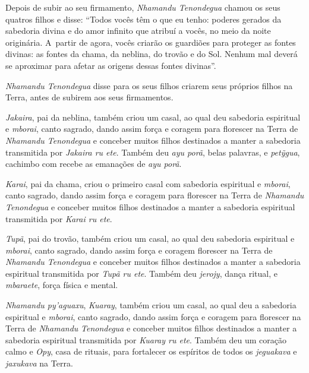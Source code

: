  



Depois de subir ao seu firmamento, \emph{Nhamandu Tenondegua} chamou os
seus quatros filhos e disse: ``Todos vocês têm o que eu tenho: poderes
gerados da sabedoria divina e do amor infinito que atribuí a vocês, no
meio da noite originária. A~partir de agora, vocês criarão os guardiões
para proteger as fontes divinas: as fontes da chama, da neblina, do
trovão e do Sol. Nenhum mal deverá se aproximar para afetar as origens
dessas fontes divinas''.

\emph{Nhamandu Tenondegua} disse para os seus filhos criarem seus
próprios filhos na Terra, antes de subirem aos seus firmamentos.

\emph{Jakaira}, pai da neblina, também criou um casal, ao qual deu
sabedoria espiritual e \emph{mborai}, canto sagrado, dando assim força e
coragem para florescer na Terra de \emph{Nhamandu Tenondegua} e conceber
muitos filhos destinados a manter a sabedoria transmitida por
\emph{Jakaira ru ete}. Também deu \emph{ayu porã}, belas palavras, e
\emph{petỹgua}, cachimbo com recebe as emanações de \emph{ayu porã}.


 

\emph{Karai}, pai da chama, criou o primeiro casal com sabedoria
espiritual e \emph{mborai}, canto sagrado, dando assim força e coragem
para florescer na Terra de \emph{Nhamandu Tenondegua} e conceber muitos
filhos destinados a manter a sabedoria espiritual transmitida por
\emph{Karai ru ete}.

\emph{Tupã}, pai do trovão, também criou um casal, ao qual deu sabedoria
espiritual e \emph{mborai}, canto sagrado, dando assim força e coragem
florescer na Terra de \emph{Nhamandu Tenondegua} e conceber muitos
filhos destinados a manter a sabedoria espiritual transmitida por
\emph{Tupã ru ete}. Também deu \emph{jerojy}, dança ritual, e
\emph{mbaraete}, força física e mental.

\emph{Nhamandu py'aguaxu}, \emph{Kuaray}, também criou um casal, ao qual
deu a sabedoria espiritual e \emph{mborai}, canto sagrado, dando assim
força e coragem para florescer na Terra de \emph{Nhamandu}
\emph{Tenondegua} e conceber muitos filhos destinados a manter a
sabedoria espiritual transmitida por \emph{Kuaray ru ete}. Também deu um
coração calmo e \emph{Opy}, casa de rituais, para fortalecer os
espíritos de todos os \emph{jeguakava} e \emph{jaxukava} na Terra.

